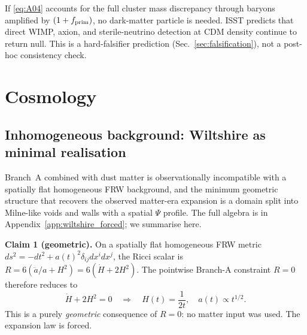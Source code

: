 \documentclass[aps,prd,twocolumn,nofootinbib,floatfix,superscriptaddress]{revtex4-2}
\newcommand{\fprim}{f_{\rm prim}}
\begin{document}
If \eqref{eq:A04} accounts for the full cluster mass discrepancy
through baryons amplified by $(1+\fprim)$, no dark-matter particle
is needed. ISST predicts that direct WIMP, axion, and sterile-neutrino
detection at CDM density continue to return null. This is a
hard-falsifier prediction (Sec.~\ref{sec:falsification}), not a
post-hoc consistency check.

\section{Cosmology}
\label{sec:cosmology}

\subsection{Inhomogeneous background: Wiltshire as minimal realisation}
\label{sec:wiltshire_forced}

Branch~A combined with dust matter is observationally incompatible
with a spatially flat homogeneous FRW background, and the minimum
geometric structure that recovers the observed matter-era expansion
is a domain split into Milne-like voids and walls with a spatial
$\Psi$ profile. The full algebra is in
Appendix~\ref{app:wiltshire_forced}; we summarise here.

\textbf{Claim 1 (geometric).} On a spatially flat homogeneous FRW
metric $ds^2 = -dt^2 + a(t)^2\delta_{ij}dx^i dx^j$, the Ricci scalar
is $R = 6(\ddot a/a + H^2) = 6(\dot H + 2H^2)$. The pointwise
Branch-A constraint $R = 0$ therefore reduces to
\begin{equation}
\label{eq:branchA_FRW_ode}
\dot H + 2H^2 = 0 \quad\Longrightarrow\quad H(t) = \frac{1}{2t},
\quad a(t)\propto t^{1/2}.
\end{equation}
This is a purely \emph{geometric} consequence of $R=0$: no matter
input was used. The expansion law is forced.
\end{document}

